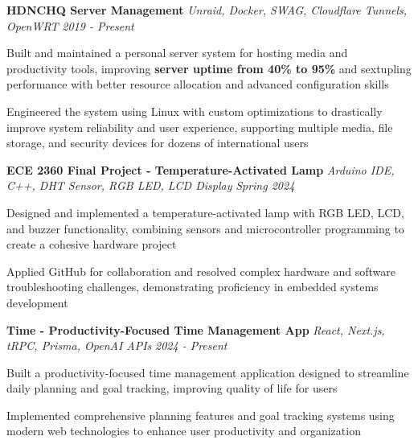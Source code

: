 \documentclass[letterpaper]{article}
\begin{document}
    {\textbf{HDNCHQ Server Management}} {\sl Unraid, Docker, SWAG, Cloudflare Tunnels, OpenWRT} \hfill \textsl{2019 - Present}\\
    \vspace{-2mm}
    \begin{tightitemize} \itemsep -1mm

        \item Built and maintained a personal server system for hosting media and productivity tools, improving \textbf{server uptime from 40\% to 95\%} and sextupling performance with better resource allocation and advanced configuration skills
        
        \item Engineered the system using Linux with custom optimizations to drastically improve system reliability and user experience, supporting multiple media, file storage, and security devices for dozens of international users
        
    \end{tightitemize}
    \vspace{-2mm}

    {\textbf{ECE 2360 Final Project - Temperature-Activated Lamp}} {\sl Arduino IDE, C++, DHT Sensor, RGB LED, LCD Display} \hfill \textsl{Spring 2024}\\
    \vspace{-2mm}
    \begin{tightitemize} \itemsep -1mm

        \item Designed and implemented a temperature-activated lamp with RGB LED, LCD, and buzzer functionality, combining sensors and microcontroller programming to create a cohesive hardware project
        
        \item Applied GitHub for collaboration and resolved complex hardware and software troubleshooting challenges, demonstrating proficiency in embedded systems development
        
    \end{tightitemize}
    \vspace{-2mm}

    {\textbf{Time - Productivity-Focused Time Management App}} {\sl React, Next.js, tRPC, Prisma, OpenAI APIs} \hfill \textsl{2024 - Present}\\
    \vspace{-2mm}
    \begin{tightitemize} \itemsep -1mm

        \item Built a productivity-focused time management application designed to streamline daily planning and goal tracking, improving quality of life for users
        
        \item Implemented comprehensive planning features and goal tracking systems using modern web technologies to enhance user productivity and organization
        
    \end{tightitemize}
    \vspace{-2mm}
\end{document}
